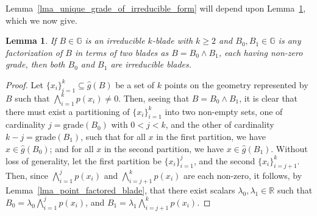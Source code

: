 \documentclass{birkjour}
\newtheorem{lem}[thm]{Lemma}
\theoremstyle{definition}
\theoremstyle{remark}
\numberwithin{equation}{section}
\newcommand{\R}{\mathbb{R}}
\newcommand{\G}{\mathbb{G}}
\newcommand{\gh}{\hat{g}}
\newcommand{\grade}{\mbox{grade}}
\begin{document}
Lemma~\ref{lma_unique_grade_of_irreducible_form} will depend upon
Lemma~\ref{lma_irreducibles_factor_as_irreducibles}, which we now give.

\begin{lem}\label{lma_irreducibles_factor_as_irreducibles}
If $B\in\G$ is an irreducible $k$-blade with $k\geq 2$ and $B_0,B_1\in\G$ is any factorization
of $B$ in terms of two blades as $B=B_0\wedge B_1$, each having non-zero grade,
then both $B_0$ and $B_1$ are irreducible blades.
\end{lem}
\begin{proof}
Let $\{x_i\}_{i=1}^k\subseteq\gh(B)$ be a set of $k$ points on the geometry represented
by $B$ such that $\bigwedge_{i=1}^k p(x_i)\neq 0$.
Then, seeing that $B=B_0\wedge B_1$, it is clear that there must exist a partitioning of
$\{x_i\}_{i=1}^k$ into two non-empty sets, one of cardinality $j=\grade(B_0)$ with $0<j<k$, and
the other of cardinality $k-j=\grade(B_1)$, such that for all $x$ in the first partition, we
have $x\in\gh(B_0)$; and for all $x$ in the second partition, we have $x\in\gh(B_1)$.
Without loss of generality, let the first partition be $\{x_i\}_{i=1}^j$,
and the second $\{x_i\}_{i=j+1}^k$.  Then, since $\bigwedge_{i=1}^j p(x_i)$
and $\bigwedge_{i=j+1}^k p(x_i)$ are each non-zero, it follows, by
Lemma~\ref{lma_point_factored_blade},
that there exist scalars $\lambda_0,\lambda_1\in\R$ such that $B_0=\lambda_0\bigwedge_{i=1}^j p(x_i)$,
and $B_1=\lambda_1\bigwedge_{i=j+1}^k p(x_i)$.
\end{proof}
\end{document}

